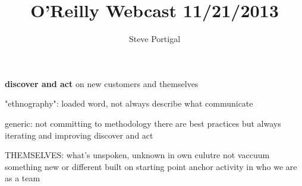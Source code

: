 \documentclass{article}
\author{Steve Portigal}
\title{O'Reilly Webcast 11/21/2013}
\begin{document}
\maketitle

{\bf discover and act} on new customers and themselves

"ethnography": loaded word, not always describe what communicate

generic: not committing to methodology
there are best practices but always iterating and improving
discover and act

THEMSELVES: what's unspoken, unknown in own culutre
not vaccuum
something new or different built on starting point
anchor activity in who we are as a team
\end{document}
